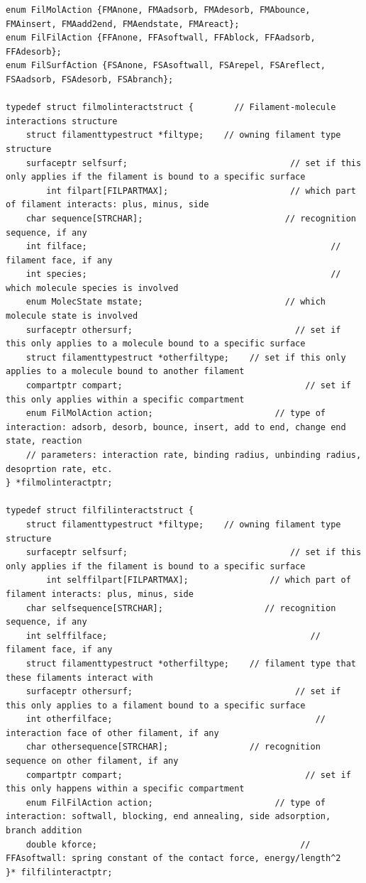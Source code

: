 \documentclass {scrbook}
\begin{document}
\begin{lstlisting}
enum FilMolAction {FMAnone, FMAadsorb, FMAdesorb, FMAbounce, FMAinsert, FMAadd2end, FMAendstate, FMAreact};
enum FilFilAction {FFAnone, FFAsoftwall, FFAblock, FFAadsorb, FFAdesorb};
enum FilSurfAction {FSAnone, FSAsoftwall, FSArepel, FSAreflect, FSAadsorb, FSAdesorb, FSAbranch};

typedef struct filmolinteractstruct {        // Filament-molecule interactions structure
    struct filamenttypestruct *filtype;    // owning filament type structure
    surfaceptr selfsurf;                                // set if this only applies if the filament is bound to a specific surface
        int filpart[FILPARTMAX];                        // which part of filament interacts: plus, minus, side
    char sequence[STRCHAR];                            // recognition sequence, if any
    int filface;                                                // filament face, if any
    int species;                                                // which molecule species is involved
    enum MolecState mstate;                            // which molecule state is involved
    surfaceptr othersurf;                                // set if this only applies to a molecule bound to a specific surface
    struct filamenttypestruct *otherfiltype;    // set if this only applies to a molecule bound to another filament
    compartptr compart;                                    // set if this only applies within a specific compartment
    enum FilMolAction action;                        // type of interaction: adsorb, desorb, bounce, insert, add to end, change end state, reaction
    // parameters: interaction rate, binding radius, unbinding radius, desoprtion rate, etc.
} *filmolinteractptr;

typedef struct filfilinteractstruct {
    struct filamenttypestruct *filtype;    // owning filament type structure
    surfaceptr selfsurf;                                // set if this only applies if the filament is bound to a specific surface
        int selffilpart[FILPARTMAX];                // which part of filament interacts: plus, minus, side
    char selfsequence[STRCHAR];                    // recognition sequence, if any
    int selffilface;                                        // filament face, if any
    struct filamenttypestruct *otherfiltype;    // filament type that these filaments interact with
    surfaceptr othersurf;                                // set if this only applies to a filament bound to a specific surface
    int otherfilface;                                        // interaction face of other filament, if any
    char othersequence[STRCHAR];                // recognition sequence on other filament, if any
    compartptr compart;                                    // set if this only happens within a specific compartment
    enum FilFilAction action;                        // type of interaction: softwall, blocking, end annealing, side adsorption, branch addition
    double kforce;                                        // FFAsoftwall: spring constant of the contact force, energy/length^2
}* filfilinteractptr;


\end{lstlisting}
\end{document}
